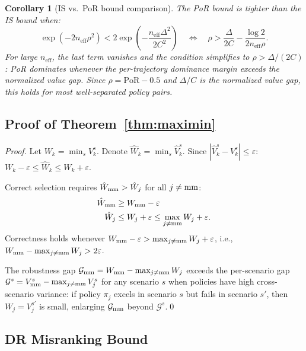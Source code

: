 \documentclass[10pt]{article}
\theoremstyle{plain}
\newtheorem{corollary}[theorem]{Corollary}
\theoremstyle{definition}
\theoremstyle{remark}
\newcommand{\PoR}{\mathrm{PoR}}
\newcommand{\neff}{n_{\mathrm{eff}}}
\begin{document}
\begin{corollary}[IS vs.\ PoR bound comparison]
  \label{cor:comparison}
  The PoR bound is tighter than the IS bound when:
  \begin{equation}
    \exp(-2\neff\rho^2) < 2\exp\!\left(-\frac{\neff\Delta^2}{2C^2}\right)
    \quad\Leftrightarrow\quad
    \rho > \frac{\Delta}{2C} - \frac{\log 2}{2\neff\rho}.
  \end{equation}
  For large $\neff$, the last term vanishes and the condition simplifies to
  $\rho>\Delta/(2C)$: PoR dominates whenever the per-trajectory dominance
  margin exceeds the normalized value gap.  Since $\rho=\PoR-0.5$ and
  $\Delta/C$ is the normalized value gap, this holds for most well-separated
  policy pairs.
\end{corollary}

\subsection{Proof of Theorem~\ref{thm:maximin}}
\label{app:proof_thm4}

\begin{proof}
Let $W_k=\min_s V^s_k$.  Denote $\hat{W}_k=\min_s\hat{V}^s_k$.
Since $|\hat{V}^s_k-V^s_k|\leq\varepsilon$:
$W_k-\varepsilon\leq\hat{W}_k\leq W_k+\varepsilon$.

Correct selection requires $\hat{W}_{\rm mm}>\hat{W}_j$ for all $j\neq{\rm mm}$:
\begin{align}
  \hat{W}_{\rm mm} &\geq W_{\rm mm}-\varepsilon\\
  \hat{W}_j &\leq W_j+\varepsilon\leq\max_{j\neq{\rm mm}}W_j+\varepsilon.
\end{align}
Correctness holds whenever $W_{\rm mm}-\varepsilon>\max_{j\neq{\rm mm}}W_j+\varepsilon$,
i.e., $W_{\rm mm}-\max_{j\neq{\rm mm}}W_j>2\varepsilon$.

The robustness gap $\mathcal{G}_{\rm mm}=W_{\rm mm}-\max_{j\neq{\rm mm}}W_j$
exceeds the per-scenario gap $\mathcal{G}^s=V^s_{\rm mm}-\max_{j\neq{\rm mm}}V^s_j$
for any scenario $s$ when policies have high cross-scenario variance: if policy
$\pi_j$ excels in scenario $s$ but fails in scenario $s'$, then $W_j=V^{s'}_j$
is small, enlarging $\mathcal{G}_{\rm mm}$ beyond $\mathcal{G}^s$.\qed
\end{proof}

\subsection{DR Misranking Bound}
\label{app:dr_bound}
\end{document}
